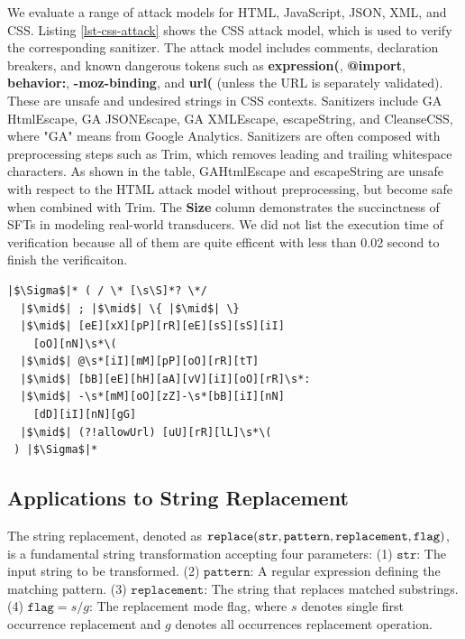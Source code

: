 We evaluate a range of attack models for HTML, JavaScript, JSON, XML, and CSS. Listing \ref{lst-css-attack} shows the CSS attack model, which is used to verify the corresponding sanitizer. The attack model includes comments, declaration breakers, and known dangerous tokens such as \textbf{expression(}, \textbf{@import}, \textbf{behavior:}, \textbf{-moz-binding}, and \textbf{url(} (unless the URL is separately validated).
These are unsafe and undesired strings in CSS contexts.
Sanitizers include GA HtmlEscape, GA JSONEscape, GA XMLEscape, escapeString, and CleanseCSS, where "GA" means from Google Analytics. Sanitizers are often composed with preprocessing steps such as Trim, which removes leading and trailing whitespace characters. As shown in the table, GAHtmlEscape and escapeString are unsafe with respect to the HTML attack model without preprocessing, but become safe when combined with Trim. The \textbf{Size} column demonstrates the succinctness of SFTs in modeling real-world transducers. We did not list the execution time of verification because all of them are quite efficent with less than 0.02 second to finish the verificaiton.




\begin{lstlisting}[language={}, caption={CSS attack model for sanitizer verification.}, label={lst-css-attack}, float=htbp]
|$\Sigma$|* ( / \* [\s\S]*? \*/
  |$\mid$| ; |$\mid$| \{ |$\mid$| \}
  |$\mid$| [eE][xX][pP][rR][eE][sS][sS][iI]
    [oO][nN]\s*\(
  |$\mid$| @\s*[iI][mM][pP][oO][rR][tT]
  |$\mid$| [bB][eE][hH][aA][vV][iI][oO][rR]\s*:
  |$\mid$| -\s*[mM][oO][zZ]-\s*[bB][iI][nN]
    [dD][iI][nN][gG]
  |$\mid$| (?!allowUrl) [uU][rR][lL]\s*\(
 ) |$\Sigma$|*
\end{lstlisting}


\subsection{Applications to String Replacement}

The string replacement, denoted as
$\texttt{replace}(\texttt{str}, \texttt{pattern}, \newline\texttt{replacement}, \texttt{flag})$, is a fundamental string transformation accepting four parameters:
(1) $\texttt{str}$: The input string to be transformed.
(2) $\texttt{pattern}$: A regular expression defining the matching pattern.
(3) $\texttt{replacement}$: The string that replaces matched substrings.
(4) $\texttt{flag}=s/g$: The replacement mode flag, where $s$ denotes single first occurrence replacement and $g$ denotes all occurrences replacement operation.

